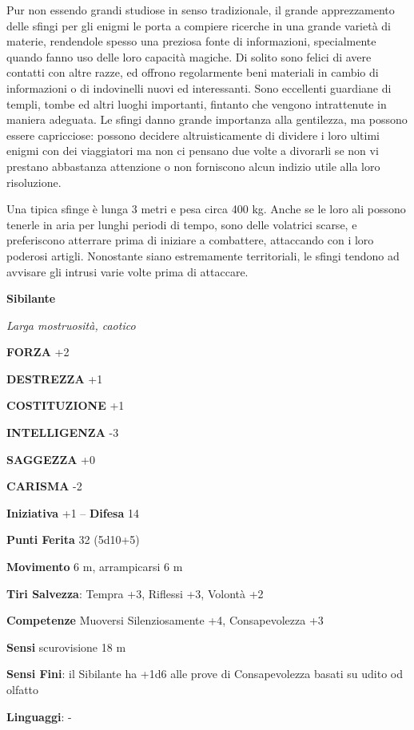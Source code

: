 \begin{multicols}{2}
	Pur non essendo grandi studiose in senso tradizionale, il grande apprezzamento delle sfingi per gli enigmi le porta a compiere ricerche in una grande varietà di materie, rendendole spesso una preziosa fonte di informazioni, specialmente quando fanno uso delle loro capacità magiche. Di solito sono felici di avere contatti con altre razze, ed offrono regolarmente beni materiali in cambio di informazioni o di indovinelli nuovi ed interessanti. Sono eccellenti guardiane di templi, tombe ed altri luoghi importanti, fintanto che vengono intrattenute in maniera adeguata. Le sfingi danno grande importanza alla gentilezza, ma possono essere capricciose: possono decidere altruisticamente di dividere i loro ultimi enigmi con dei viaggiatori ma non ci pensano due volte a divorarli se non vi prestano abbastanza attenzione o non forniscono alcun indizio utile alla loro risoluzione.

	Una tipica sfinge è lunga 3 metri e pesa circa 400 kg. Anche se le loro ali possono tenerle in aria per lunghi periodi di tempo, sono delle volatrici scarse, e preferiscono atterrare prima di iniziare a combattere, attaccando con i loro poderosi artigli. Nonostante siano estremamente territoriali, le sfingi tendono ad avvisare gli intrusi varie volte prima di attaccare.

	\medskip{}\textbf{Sibilante}

	\textit{Larga mostruosità, caotico}

	\textbf{FORZA} +2

	\textbf{DESTREZZA} +1

	\textbf{COSTITUZIONE} +1

	\textbf{INTELLIGENZA} -3

	\textbf{SAGGEZZA} +0

	\textbf{CARISMA} -2

	\textbf{Iniziativa} +1 -- \textbf{Difesa} 14

	\textbf{Punti Ferita} 32 (5d10+5)

	\textbf{Movimento} 6 m, arrampicarsi 6 m

	\textbf{Tiri Salvezza}: Tempra +3, Riflessi +3, Volontà +2

	\textbf{Competenze} Muoversi Silenziosamente +4, Consapevolezza +3

	\textbf{Sensi} scurovisione 18 m

	\textbf{Sensi Fini}: il Sibilante ha +1d6 alle prove di Consapevolezza basati su udito od olfatto

	\textbf{Linguaggi}: -


\end{multicols}
